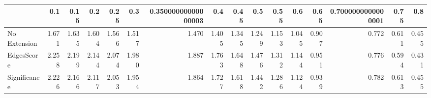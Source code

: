 \begin{tabular}{lrrrrrrrrrrrrrrr}
\toprule
{} &   0.1 &  0.15 &   0.2 &  0.25 &   0.3 & 0.35000000000000003 &   0.4 &  0.45 &   0.5 &  0.55 &   0.6 &  0.65 & 0.7000000000000001 &  0.75 &   0.8 \\
\midrule
No Extension & 1.671 & 1.635 & 1.604 & 1.566 & 1.517 &               1.470 & 1.405 & 1.345 & 1.249 & 1.153 & 1.045 & 0.907 &              0.772 & 0.611 & 0.455 \\
EdgesScore   & 2.258 & 2.199 & 2.144 & 2.074 & 1.980 &               1.887 & 1.763 & 1.648 & 1.476 & 1.312 & 1.144 & 0.951 &              0.776 & 0.594 & 0.431 \\
Significance & 2.226 & 2.166 & 2.117 & 2.053 & 1.954 &               1.864 & 1.727 & 1.618 & 1.442 & 1.286 & 1.124 & 0.939 &              0.782 & 0.613 & 0.455 \\
\bottomrule
\end{tabular}
